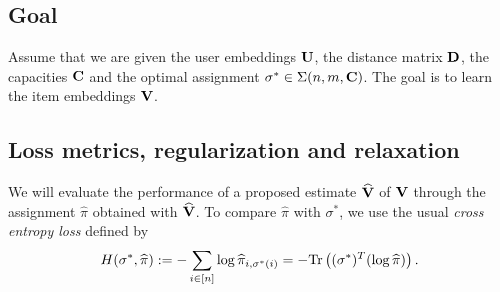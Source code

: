 \subsection*{Goal} Assume that we are given the user embeddings $\mathbf{U}$, the distance matrix $\mathbf{D}$, the capacities $\mathbf{C}$ and the optimal assignment $\sigma^* \in \Sigma(n,m,\mathbf{C})$. The goal is to learn the item embeddings $\mathbf{V}$.

\subsection*{Loss metrics, regularization and relaxation}
We will evaluate the performance of a proposed estimate $\widehat{\mathbf{V}}$ of $\mathbf{V}$ through the assignment $\widehat{\pi}$ obtained with $\widehat{\mathbf{V}}$. To compare $\widehat{\pi}$ with $\sigma^*$, we use the usual \emph{cross entropy loss} defined by
\begin{equation*}
    H(\sigma^*,\widehat{\pi}) := - \sum_{i \in [n]} \log{\widehat{\pi}_{i,\sigma^*(i)}} = - {\rm Tr}\left( (\sigma^*)^T (\log \widehat{\pi}) \right).
\end{equation*}




